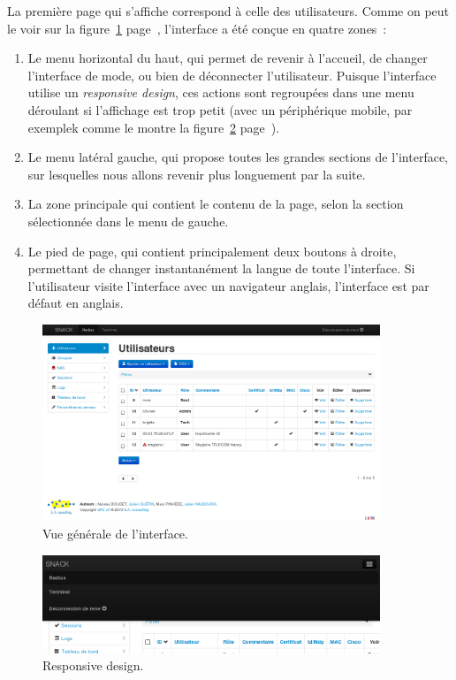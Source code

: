 La première page qui s'affiche correspond à celle des utilisateurs. Comme on peut le voir sur la figure~\ref{general} page~\pageref{general}, l'interface a été conçue en quatre zones~:

\begin{enumerate}
\item Le menu horizontal du haut, qui permet de revenir à l'accueil, de changer l'interface de mode, ou bien de déconnecter l'utilisateur. Puisque l'interface utilise un \emph{responsive design}, ces actions sont regroupées dans une menu déroulant si l'affichage est trop petit (avec un périphérique mobile, par exemplek comme le montre la figure~\ref{responsive} page~\pageref{responsive}).
\item Le menu latéral gauche, qui propose toutes les grandes sections de l'interface, sur lesquelles nous allons revenir plus longuement par la suite.
\item La zone principale qui contient le contenu de la page, selon la section sélectionnée dans le menu de gauche.
\item Le pied de page, qui contient principalement deux boutons à droite, permettant de changer instantanément la langue de toute l'interface. Si l'utilisateur visite l'interface avec un navigateur anglais, l'interface est par défaut en anglais.
\end{enumerate}

\begin{figure}[!h]
	\begin{center}
	    \includegraphics[width=0.9\textwidth]{img/general.png}
	\end{center}
	\caption{Vue générale de l'interface.}
	\label{general}
\end{figure}

\begin{figure}[!h]
	\begin{center}
	    \includegraphics[width=0.9\textwidth]{img/responsive.png}
	\end{center}
	\caption{Responsive design.}
	\label{responsive}
\end{figure}

